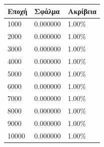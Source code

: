 \begin{center}
\begin{tabular}{|l|l|l|}
\hline
\textbf{Εποχή} & \textbf{Σφάλμα} & \textbf{Ακρίβεια} \\ \hline
1000		   & 0.000000        & 1.00\%            \\ \hline
2000		   & 0.000000        & 1.00\%            \\ \hline
3000		   & 0.000000        & 1.00\%            \\ \hline
4000		   & 0.000000        & 1.00\%            \\ \hline
5000		   & 0.000000        & 1.00\%            \\ \hline
6000		   & 0.000000        & 1.00\%            \\ \hline
7000		   & 0.000000        & 1.00\%            \\ \hline
8000		   & 0.000000        & 1.00\%            \\ \hline
9000		   & 0.000000        & 1.00\%            \\ \hline
10000		   & 0.000000        & 1.00\%            \\ \hline
\end{tabular}
\end{center}
 \label{tab:title}
